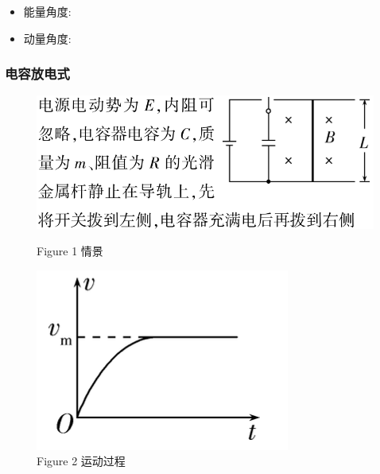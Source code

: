 \documentclass{article}
\begin{document}
\begin{enumerate}[label = (\arabic*{})]
          \vspace{2em}

          \begin{itemize}
              \item 能量角度:
                    \vspace{5em}
              \item 动量角度:
                    \vspace{5em}
          \end{itemize}

          \vspace{2em}

\end{enumerate}

\vspace{2em}

\subsubsection{电容放电式}

\begin{figure}[H]
    \begin{minipage}{0.6\textwidth}
        \centering
        \includegraphics[width = \textwidth]{pictures/15.png}
        \caption*{Figure 1 情景}
    \end{minipage}
    \hfill
    \begin{minipage}{0.35\textwidth}
        \centering
        \includegraphics[width = \textwidth]{pictures/16.png}
        \caption*{Figure 2 运动过程}
    \end{minipage}
\end{figure}
\end{document}
